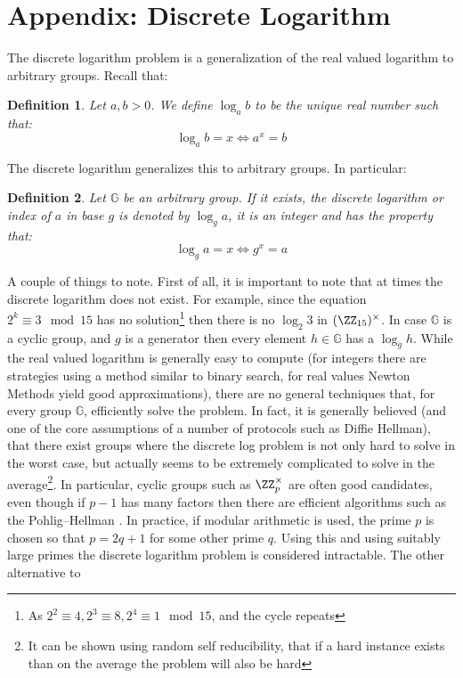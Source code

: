 \documentclass{article}
\newtheorem{definition}{Definition}
\begin{document}
\section{Appendix: Discrete Logarithm}
The discrete logarithm problem is a generalization of the real valued logarithm to arbitrary groups. Recall that:
\begin{definition}
    Let $a, b > 0$. We define $\log_a b$ to be the unique real number  such that:
    \[ \log_a b = x \iff a^x = b \]
\end{definition}
The discrete logarithm generalizes this to arbitrary groups. In particular:
\begin{definition}
    Let $\mathbb{G}$ be an arbitrary group. If it exists, the discrete logarithm or index of $a$ in base $g$ is denoted
    by $\log_g a$, it is an integer and has the property that:
    \[ \log_g a = x \iff g^x = a \]
\end{definition}
A couple of things to note. First of all, it is important to note that at times the discrete logarithm does not exist.
For example, since the equation $2^k \equiv 3 \mod 15$ has no solution\footnote{As $2^2 \equiv 4, 2^3 \equiv 8, 2^4 \equiv 1 \mod 15$, and the cycle repeats}
then there is no $\log_2 3$ in $(\ZZ_{15})^\times$. In case $\mathbb{G}$ is a cyclic group, and $g$ is a generator then
every element $h \in \mathbb{G}$ has a $\log_g h$. While the real valued logarithm is generally easy to compute (for integers there
are strategies using a method similar to binary search, for real values Newton Methods yield good approximations), there are no
general techniques that, for every group $\mathbb{G}$, efficiently solve the problem. In fact, it is generally believed (and one
of the core assumptions of a number of protocols such as Diffie Hellman), that there exist groups where the discrete log problem
is not only hard to solve in the worst case, but actually seems to be extremely complicated to solve in the average\footnote{It can be shown
    using random self reducibility, that if a hard instance exists than on the average the problem will also be hard}.
In particular, cyclic groups such as $\ZZ_p^\times$ are often good candidates, even though if $p - 1$ has many factors
then there are efficient algorithms such as the Pohlig–Hellman \cite{pohligImprovedAlgorithmComputing1978}. In practice,
if modular arithmetic is used, the prime $p$ is chosen so that $p = 2q + 1$ for some other prime $q$. Using this and using
suitably large primes the discrete logarithm problem is considered intractable. The other alternative to
\end{document}
